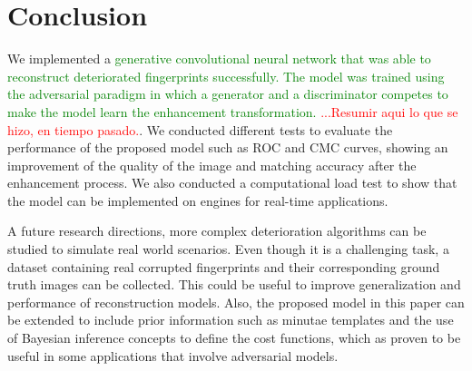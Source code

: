 \documentclass[a4paper,fleqn]{cas-dc}
\begin{document}
\section{Conclusion}
\label{sec:CON}
\label{sec:FW}
We implemented a \textcolor{green}{generative convolutional neural network that was able to reconstruct deteriorated fingerprints successfully. The model was trained using the adversarial paradigm in which a generator and a discriminator competes to make the model learn the enhancement transformation.} \textcolor{red}{...Resumir aqui lo que se hizo, en tiempo pasado.}. We conducted different tests to evaluate the performance of the proposed model such as ROC and CMC curves, showing an improvement of the quality of the image and matching accuracy after the enhancement process. We also conducted a computational load test to show that the model can be implemented on engines for real-time applications. 


A future research directions, more complex deterioration algorithms can be studied to simulate real world scenarios. Even though it is a challenging task, a dataset containing real corrupted fingerprints and their corresponding ground truth images can be collected. This could be useful to improve generalization and performance of reconstruction models. Also, the proposed model in this paper can be extended to include prior information such as minutae templates and the use of Bayesian inference concepts to define the cost functions, which as proven to be useful in some applications that involve adversarial models.

\printcredits

%





\end{document}
